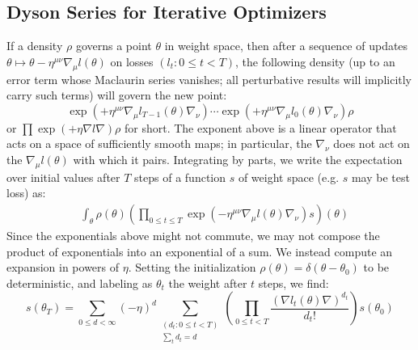 \documentclass{article}
\begin{document}
\subsection{Dyson Series for Iterative Optimizers}
    If a density $\rho$ governs a point $\theta$ in weight space, then after a
    sequence of updates $\theta \mapsto \theta - \eta^{\mu\nu} \nabla_\mu
    l(\theta)$ on losses $(l_t: 0\leq t < T)$, the following density (up to an
    error term whose Maclaurin series vanishes; all perturbative results will
    implicitly carry such terms) will govern the new point:
    \begin{equation}\label{eq:descexp}
        \exp\left(+\eta^{\mu\nu} \nabla_\mu l_{T-1}(\theta) \nabla_\nu\right) \cdots \exp\left(+\eta^{\mu\nu} \nabla_\mu l_0(\theta) \nabla_\nu\right) \rho
    \end{equation}
    or
    $
        \prod \exp\left(+\eta \nabla l \nabla\right) \rho
    $
    for short.
    The exponent above is a linear operator that acts on a space of
    sufficiently smooth maps; in particular, the $\nabla_\nu$ does not act on
    the $\nabla_\mu l(\theta)$ with which it pairs.  Integrating by parts, we
    write the expectation over initial values after $T$ steps of a function $s$
    of weight space (e.g. $s$ may be test loss) as:
    \begin{align}\label{eq:contraexp}
        &\int_\theta \rho(\theta) \left(\prod_{0 \leq t \leq T} \exp\left(-\eta^{\mu\nu} \nabla_\mu l(\theta) \nabla_\nu\right) s\right)(\theta)
    \end{align}
    Since the exponentials above might not commute, we may not compose
    the product of exponentials into an exponential of a sum.  We instead
    compute an expansion in powers of $\eta$.  Setting the initialization
    $\rho(\theta) = \delta(\theta-\theta_0)$ to be deterministic, and labeling
    as $\theta_t$ the weight after $t$ steps, we find:
    \begin{equation}\label{eq:dyson}
        s(\theta_T) =
        \sum_{0\leq d < \infty} (-\eta)^d \sum_{\substack{(d_t: 0\leq t<T) \\ \sum_t d_t = d}}
        \left(\prod_{0 \leq t < T} \frac{(\nabla l_t(\theta) \nabla)^{d_t}}{d_t!}\right) s (\theta_0)
    \end{equation}
\end{document}
